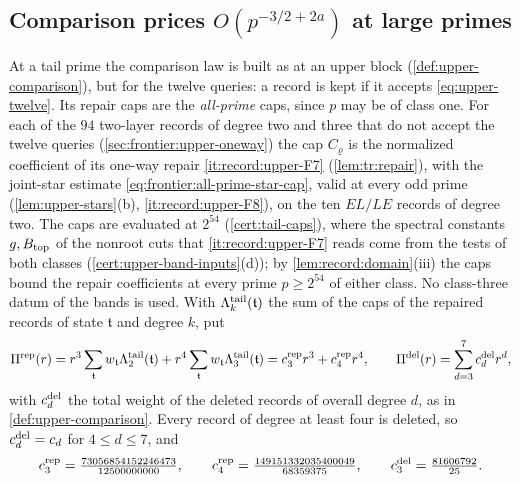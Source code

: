 \subsection{Comparison prices \texorpdfstring{$O(p^{-3/2+2a})$}{O(p\textasciicircum (-3/2+2a))} at large primes}\label{subsec:tail-prices}

At a tail prime the comparison law is built as at an upper block
(\cref{def:upper-comparison}), but for the twelve queries: a record is kept if
it accepts \eqref{eq:upper-twelve}. Its repair caps are the \emph{all-prime}
caps, since $p$ may be of class one. For each of the $94$ two-layer records
of degree two and three that do not accept the twelve queries
(\cref{sec:frontier:upper-oneway}) the cap $C_\varrho$ is the normalized
coefficient of its one-way repair \ref{it:record:upper-F7}
(\cref{lem:tr:repair}), with the joint-star estimate
\eqref{eq:frontier:all-prime-star-cap}, valid at every odd prime
(\cref{lem:upper-stars}(b), \ref{it:record:upper-F8}), on the ten $EL/LE$
records of degree two. The caps are evaluated at $2^{54}$
(\cref{cert:tail-caps}), where the spectral constants $g,B_{\rm top}$ of the
nonroot cuts that \ref{it:record:upper-F7} reads come from the tests of both
classes (\cref{cert:upper-band-inputs}(d)); by \cref{lem:record:domain}(iii)
the caps bound the repair coefficients at every prime $p\ge2^{54}$ of either
class. No class-three datum of the bands is used. With
$\Lambda^{\rm tail}_k(\mathfrak t)$ the sum of the caps of the repaired
records of state $\mathfrak t$ and degree $k$, put
\begin{equation}\label{eq:tail-polynomials}
 \Pi^{\rm rep}(r)=r^3\sum_{\mathfrak t}w_{\mathfrak t}\Lambda^{\rm tail}_2(\mathfrak t)
 +r^4\sum_{\mathfrak t}w_{\mathfrak t}\Lambda^{\rm tail}_3(\mathfrak t)
 =c^{\rm rep}_3r^3+c^{\rm rep}_4r^4,\qquad
 \Pi^{\rm del}(r)=\sum_{d=3}^7c^{\rm del}_dr^d,
\end{equation}
with $c^{\rm del}_d$ the total weight of the deleted records of overall
degree $d$, as in \cref{def:upper-comparison}. Every record of degree at
least four is deleted, so $c^{\rm del}_d=c_d$ for $4\le d\le7$, and
\[
 c^{\rm rep}_3=\tfrac{73056854152246473}{12500000000},\qquad
 c^{\rm rep}_4=\tfrac{149151332035400049}{68359375},\qquad
 c^{\rm del}_3=\tfrac{81606792}{25}.
\]

